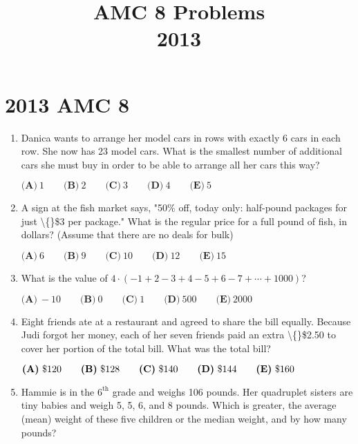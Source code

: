 \documentclass{article}
\title{AMC 8 Problems \\ 2013}
\date{}
\begin{document}
\maketitle\thispagestyle{fancy}\newpage\section*{2013 AMC 8}
\begin{enumerate}[label=\arabic*., itemsep=0.5em]
\item Danica wants to arrange her model cars in rows with exactly 6 cars in each row. She now has 23 model cars. What is the smallest number of additional cars she must buy in order to be able to arrange all her cars this way?

\(\textbf{(A)}\ 1 \qquad \textbf{(B)}\ 2 \qquad \textbf{(C)}\ 3 \qquad \textbf{(D)}\ 4 \qquad \textbf{(E)}\ 5\)\par \vspace{0.5em}\item A sign at the fish market says, "50\% off, today only: half-pound packages for just \textbackslash\{\}\$3 per package." What is the regular price for a full pound of fish, in dollars? (Assume that there are no deals for bulk)

\(\textbf{(A)}\ 6 \qquad \textbf{(B)}\ 9 \qquad \textbf{(C)}\ 10 \qquad \textbf{(D)}\ 12 \qquad \textbf{(E)}\ 15\)\par \vspace{0.5em}\item What is the value of \(4 \cdot (-1+2-3+4-5+6-7+\cdots+1000)\)?

\(\textbf{(A)}\ -10 \qquad \textbf{(B)}\ 0 \qquad \textbf{(C)}\ 1 \qquad \textbf{(D)}\ 500 \qquad \textbf{(E)}\ 2000\)\par \vspace{0.5em}\item Eight friends ate at a restaurant and agreed to share the bill equally. Because Judi forgot her money, each of her seven friends paid an extra \textbackslash\{\}\$2.50 to cover her portion of the total bill. What was the total bill?

\( \textbf{(A)}\ \text{\textdollar}120\qquad\textbf{(B)}\ \text{\textdollar}128\qquad\textbf{(C)}\ \text{\textdollar}140\qquad\textbf{(D)}\ \text{\textdollar}144\qquad\textbf{(E)}\ \text{\textdollar}160 \)\par \vspace{0.5em}\item Hammie is in the \(6^\text{th}\) grade and weighs 106 pounds. Her quadruplet sisters are tiny babies and weigh 5, 5, 6, and 8 pounds. Which is greater, the average (mean) weight of these five children or the median weight, and by how many pounds?


\end{enumerate}
\end{document}
